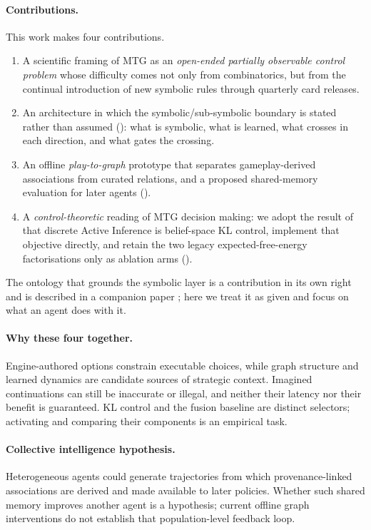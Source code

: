 \documentclass[11pt,a4paper]{article}
\theoremstyle{definition}
\theoremstyle{plain}
\begin{document}
\paragraph{Contributions.} This work makes four contributions.
\begin{enumerate}[leftmargin=1.2em, itemsep=2pt]
  \item A scientific framing of MTG as an \emph{open-ended partially observable control problem} whose difficulty comes not only from combinatorics, but from the continual introduction of new symbolic rules through quarterly card releases.
  \item An architecture in which the symbolic/sub-symbolic boundary is stated rather than assumed (): what is symbolic, what is learned, what crosses in each direction, and what gates the crossing.
  \item An offline \emph{play-to-graph} prototype that separates gameplay-derived associations from curated relations, and a proposed shared-memory evaluation for later agents ().
  \item A \emph{control-theoretic} reading of MTG decision making: we adopt the result of \citet{kaufmann2026aifcontrol} that discrete Active Inference is belief-space KL control, implement that objective directly, and retain the two legacy expected-free-energy factorisations only as ablation arms ().
\end{enumerate}

The ontology that grounds the symbolic layer is a contribution in its own right and is described in a companion paper \citep{neuburger2026ontology}; here we treat it as given and focus on what an agent does with it.

\paragraph{Why these four together.} Engine-authored options constrain executable choices, while graph structure and learned dynamics are candidate sources of strategic context. Imagined continuations can still be inaccurate or illegal, and neither their latency nor their benefit is guaranteed. KL control and the fusion baseline are distinct selectors; activating and comparing their components is an empirical task.

\paragraph{Collective intelligence hypothesis.} Heterogeneous agents could generate trajectories from which provenance-linked associations are derived and made available to later policies. Whether such shared memory improves another agent is a hypothesis; current offline graph interventions do not establish that population-level feedback loop.
\end{document}
